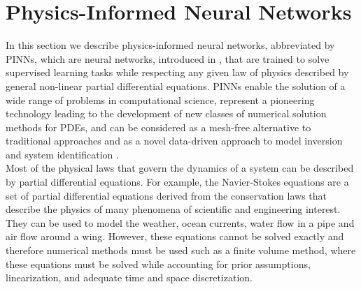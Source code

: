 \section{Physics-Informed Neural Networks}
\label{ch1:sec4}

In this section we describe physics-informed neural networks, abbreviated by PINNs, which are neural networks, introduced in \cite{RaissiPerdikarisKarniadakisPart1:2017}, that are trained to solve supervised learning tasks while respecting any given law of physics described by general non-linear partial differential equations. PINNs enable the solution of a wide range of problems in computational science, represent a pioneering technology leading to the development of new classes of numerical solution methods for PDEs, and can be considered as a mesh-free alternative to traditional approaches and as a novel data-driven approach to model inversion and system identification \cite[p.~3]{RaissiPerdikarisKarniadakis:2019}. \\
Most of the physical laws that govern the dynamics of a system can be described by partial differential equations. For example, the Navier-Stokes equations are a set of partial differential equations derived from the conservation laws that describe the physics of many phenomena of scientific and engineering interest. They can be used to model the weather, ocean currents, water flow in a pipe and air flow around a wing. However, these equations cannot be solved exactly and therefore numerical methods must be used such as a finite volume method, where these equations must be solved while accounting for prior assumptions, linearization, and adequate time and space discretization. \\
